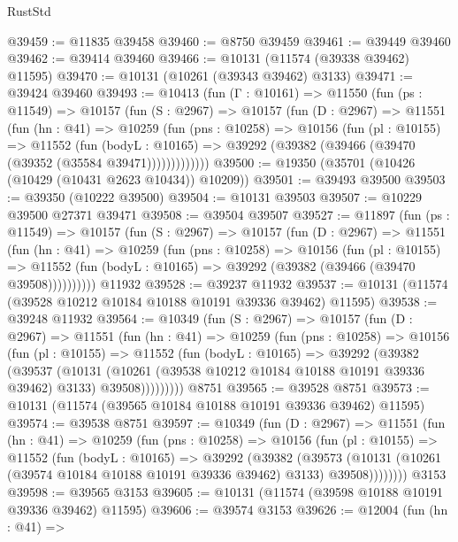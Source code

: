 \begin{lexlean}{RustStd}
\begin{coremodule}
@39459 := @11835 @39458
@39460 := @8750 @39459
@39461 := @39449 @39460
@39462 := @39414 @39460
@39466 := @10131 (@11574 (@39338 @39462) @11595)
@39470 := @10131 (@10261 (@39343 @39462) @3133)
@39471 := @39424 @39460
@39493 := @10413
    (fun (Γ : @10161) =>
    @11550
      (fun (ps : @11549) =>
      @10157
        (fun (S : @2967) =>
        @10157
          (fun (D : @2967) =>
          @11551
            (fun (hn : @41) =>
            @10259
              (fun (pns : @10258) =>
              @10156
                (fun (pl : @10155) =>
                @11552
                  (fun (bodyL : @10165) =>
                  @39292 (@39382 (@39466 (@39470 (@39352 (@35584 @39471)))))))))))))
@39500 := @19350 (@35701 (@10426 (@10429 (@10431 @2623 @10434)) @10209))
@39501 := @39493 @39500
@39503 := @39350 (@10222 @39500)
@39504 := @10131 @39503
@39507 := @10229 @39500 @27371 @39471
@39508 := @39504 @39507
@39527 := @11897
    (fun (ps : @11549) =>
    @10157
      (fun (S : @2967) =>
      @10157
        (fun (D : @2967) =>
        @11551
          (fun (hn : @41) =>
          @10259
            (fun (pns : @10258) =>
            @10156
              (fun (pl : @10155) =>
              @11552 (fun (bodyL : @10165) => @39292 (@39382 (@39466 (@39470 @39508))))))))))
    @11932
@39528 := @39237 @11932
@39537 := @10131 (@11574 (@39528 @10212 @10184 @10188 @10191 @39336 @39462) @11595)
@39538 := @39248 @11932
@39564 := @10349
    (fun (S : @2967) =>
    @10157
      (fun (D : @2967) =>
      @11551
        (fun (hn : @41) =>
        @10259
          (fun (pns : @10258) =>
          @10156
            (fun (pl : @10155) =>
            @11552
              (fun (bodyL : @10165) =>
              @39292
                (@39382
                  (@39537
                    (@10131
                      (@10261 (@39538 @10212 @10184 @10188 @10191 @39336 @39462) @3133)
                      @39508)))))))))
    @8751
@39565 := @39528 @8751
@39573 := @10131 (@11574 (@39565 @10184 @10188 @10191 @39336 @39462) @11595)
@39574 := @39538 @8751
@39597 := @10349
    (fun (D : @2967) =>
    @11551
      (fun (hn : @41) =>
      @10259
        (fun (pns : @10258) =>
        @10156
          (fun (pl : @10155) =>
          @11552
            (fun (bodyL : @10165) =>
            @39292
              (@39382
                (@39573
                  (@10131 (@10261 (@39574 @10184 @10188 @10191 @39336 @39462) @3133) @39508))))))))
    @3153
@39598 := @39565 @3153
@39605 := @10131 (@11574 (@39598 @10188 @10191 @39336 @39462) @11595)
@39606 := @39574 @3153
@39626 := @12004
    (fun (hn : @41) =>

\end{coremodule}
\end{lexlean}
